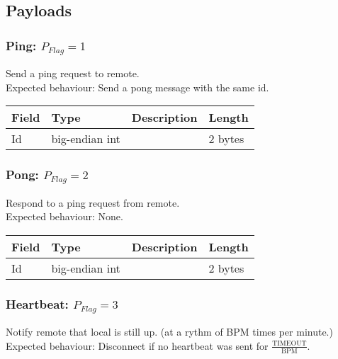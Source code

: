 \documentclass[a4paper,10pt]{article}
\begin{document}
        \subsection{Payloads}
        
            \subsubsection{Ping: $P_{Flag} = 1$}
                Send a ping request to remote.\\
                Expected behaviour: Send a pong message with the same id.\\
                
                \noindent\begin{tabularx}{\textwidth}{|l|l|X|l|}
                    \hline Field & Type & Description & Length \\ \hline
                    \hline Id & big-endian int & & 2 bytes \\
                    \hline
                \end{tabularx}
            
            \subsubsection{Pong: $P_{Flag} = 2$}
                Respond to a ping request from remote.\\
                Expected behaviour: None.\\
                
                \noindent\begin{tabularx}{\textwidth}{|l|l|X|l|}
                    \hline Field & Type & Description & Length \\ \hline
                    \hline Id & big-endian int & & 2 bytes \\
                    \hline
                \end{tabularx}
            
            \subsubsection{Heartbeat: $P_{Flag} = 3$}
                Notify remote that local is still up. (at a rythm of BPM times per minute.)\\
                Expected behaviour: Disconnect if no heartbeat was sent for $\frac{\text{TIMEOUT}}{\text{BPM}}$.\\
                
\end{document}
